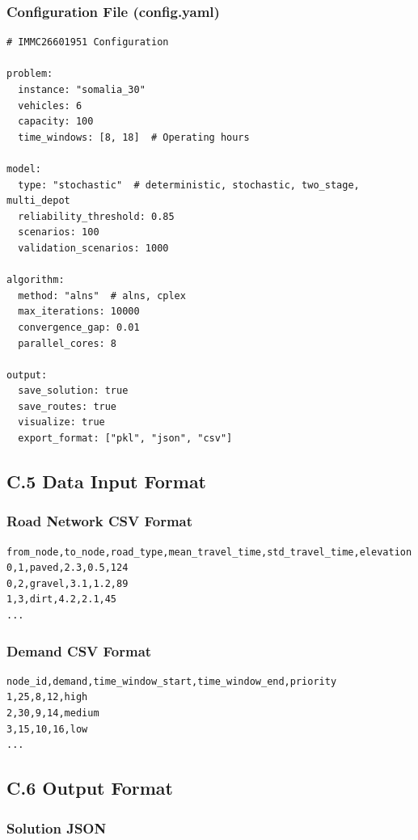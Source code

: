 \subsubsection{Configuration File (config.yaml)}

\begin{verbatim}
# IMMC26601951 Configuration

problem:
  instance: "somalia_30"
  vehicles: 6
  capacity: 100
  time_windows: [8, 18]  # Operating hours

model:
  type: "stochastic"  # deterministic, stochastic, two_stage, multi_depot
  reliability_threshold: 0.85
  scenarios: 100
  validation_scenarios: 1000

algorithm:
  method: "alns"  # alns, cplex
  max_iterations: 10000
  convergence_gap: 0.01
  parallel_cores: 8

output:
  save_solution: true
  save_routes: true
  visualize: true
  export_format: ["pkl", "json", "csv"]
\end{verbatim}

\subsection{C.5 Data Input Format}

\subsubsection{Road Network CSV Format}

\begin{verbatim}
from_node,to_node,road_type,mean_travel_time,std_travel_time,elevation
0,1,paved,2.3,0.5,124
0,2,gravel,3.1,1.2,89
1,3,dirt,4.2,2.1,45
...
\end{verbatim}

\subsubsection{Demand CSV Format}

\begin{verbatim}
node_id,demand,time_window_start,time_window_end,priority
1,25,8,12,high
2,30,9,14,medium
3,15,10,16,low
...
\end{verbatim}

\subsection{C.6 Output Format}

\subsubsection{Solution JSON}

